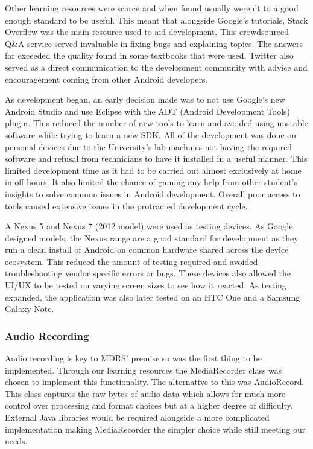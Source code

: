 \documentclass{l3proj}
\begin{document}
Other learning resources were scarce and when found usually weren't to a good enough standard to be useful. This meant that alongside Google's tutorials, Stack Overflow was the main resource used to aid development. This crowdsourced Q\&A service served invaluable in fixing bugs and explaining topics. The answers far exceeded the quality found in some textbooks that were used. Twitter also served as a direct communication to the development community with advice and encouragement coming from other Android developers.

As development began, an early decision made was to not use Google's new Android Studio and use Eclipse with the ADT (Android Development Tools) plugin. This reduced the number of new tools to learn and avoided using unstable software while trying to learn a new SDK. All of the development was done on personal devices due to the University's lab machines not having the required software and refusal from technicians to have it installed in a useful manner. This limited development time as it had to be carried out almost exclusively at home in off-hours. It also limited the chance of gaining any help from other student's insights to solve common issues in Android development. Overall poor access to tools caused extensive issues in the protracted  development cycle.

A Nexus 5 and Nexus 7 (2012 model) were used as testing devices. As Google designed models, the Nexus range are a good standard for development as they run a clean install of Android on common hardware shared across the device ecosystem. This reduced the amount of testing required and avoided troubleshooting vendor specific errors or bugs. These devices also allowed the UI/UX to be tested on varying screen sizes to see how it reacted. As testing expanded, the application was also later tested on an HTC One and a Samsung Galaxy Note.

\subsubsection{Audio Recording}    Audio recording is key to MDRS' premise so was the first thing to be implemented. Through our learning resources the MediaRecorder class was chosen to implement this functionality. The alternative to this was AudioRecord. This class captures the raw bytes of audio data which allows for much more control over processing and format choices but at a higher degree of difficulty. External Java libraries would be required alongside a more complicated implementation making MediaRecorder the simpler choice while still meeting our needs.
\end{document}
